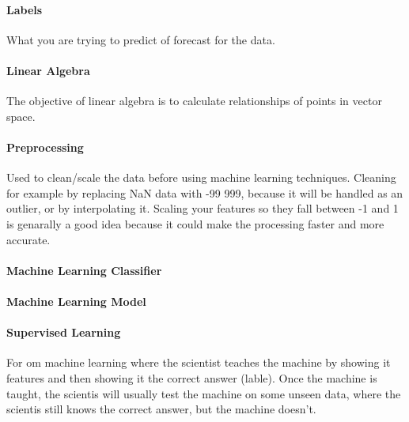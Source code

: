\paragraph{Labels} 
What you are trying to predict of forecast for the data.

\paragraph{Linear Algebra} 
The objective of linear algebra is to calculate relationships of points in vector space. 

\paragraph{Preprocessing} 
Used to clean/scale the data before using machine learning techniques. Cleaning for example by replacing NaN data with -99 999, because it will be handled as an outlier, or by interpolating it. Scaling your features so they fall between -1 and 1 is genarally a good idea because it could make the processing faster and more accurate.

\paragraph{Machine Learning Classifier} %

\paragraph{Machine Learning Model} %

\paragraph{Supervised Learning} 
For om machine learning where the scientist teaches the machine by showing it features and then showing it the correct answer (lable). Once the machine is taught, the scientis will usually test the machine on some unseen data, where the scientis still knows the correct answer, but the machine doesn't.


